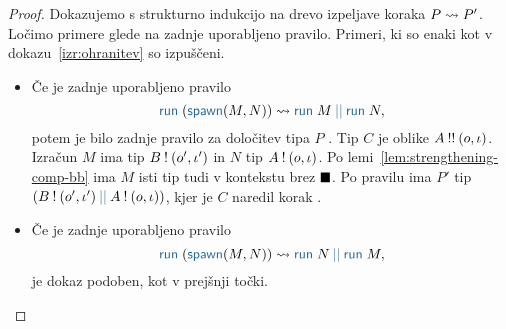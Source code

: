 \begin{proof}
	Dokazujemo s strukturno indukcijo na drevo izpeljave koraka $P \leadsto P'$.
	Ločimo primere glede na zadnje uporabljeno pravilo.
	Primeri, ki so enaki kot v dokazu~\ref{izr:ohranitev} so izpuščeni.
	
	\begin{itemize}
		
		\item Če je zadnje uporabljeno pravilo
		$$\tmrun{(\tmspawn{M}{N})} \reduces \tmpar{\tmrun{M}}{\tmrun{N}},$$
		potem je bilo zadnje pravilo za določitev tipa $P$ . Tip $C$ je oblike $A \mathbin{!!} (o, \iota)$.
		Izračun $M$ ima tip $B \mathbin{!} (o', \iota')$ in $N$ tip $A \mathbin{!} (o, \iota)$.
		Po lemi~\ref{lem:strengthening-comp-bb} ima $M$ isti tip tudi v kontekstu brez $\blacksquare$.
		Po pravilu  ima $P'$ tip $\typar{\tycomp{B}{\o', \i'}}{\tycomp{A}{\o, \i}}$, kjer je $C$ naredil korak .
		
		\item Če je zadnje uporabljeno pravilo
		$$\tmrun{(\tmspawn{M}{N})} \reduces \tmpar{\tmrun{N}}{\tmrun{M}},$$
		je dokaz podoben, kot v prejšnji točki.
	\end{itemize}

\end{proof}



